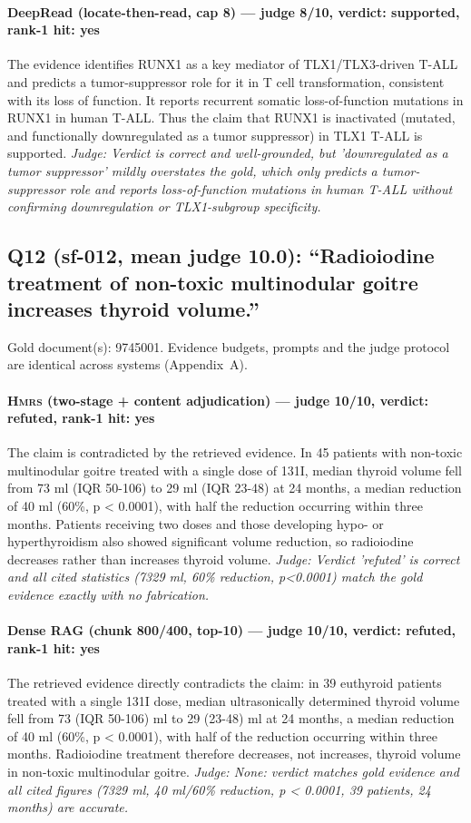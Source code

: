 \documentclass[sigconf, review, anonymous]{acmart}
\begin{document}
\paragraph{DeepRead (locate-then-read, cap 8) --- judge 8/10, verdict: supported, rank-1 hit: yes}
\noindent The evidence identifies RUNX1 as a key mediator of TLX1/TLX3-driven T-ALL and predicts a tumor-suppressor role for it in T cell transformation, consistent with its loss of function. It reports recurrent somatic loss-of-function mutations in RUNX1 in human T-ALL. Thus the claim that RUNX1 is inactivated (mutated, and functionally downregulated as a tumor suppressor) in TLX1 T-ALL is supported.
\noindent\small\textit{Judge: Verdict is correct and well-grounded, but 'downregulated as a tumor suppressor' mildly overstates the gold, which only predicts a tumor-suppressor role and reports loss-of-function mutations in human T-ALL without confirming downregulation or TLX1-subgroup specificity.}

\subsection{Q12 (sf-012, mean judge 10.0): ``Radioiodine treatment of non-toxic multinodular goitre increases thyroid volume.''}
\label{app:q12}
\noindent Gold document(s): 9745001. Evidence budgets, prompts and the judge protocol are identical across systems (Appendix~A).
\paragraph{\textbf{\textsc{Hmrs}} (two-stage + content adjudication) --- judge 10/10, verdict: refuted, rank-1 hit: yes}
\noindent The claim is contradicted by the retrieved evidence. In 45 patients with non-toxic multinodular goitre treated with a single dose of 131I, median thyroid volume fell from 73 ml (IQR 50-106) to 29 ml (IQR 23-48) at 24 months, a median reduction of 40 ml (60\%, p < 0.0001), with half the reduction occurring within three months. Patients receiving two doses and those developing hypo- or hyperthyroidism also showed significant volume reduction, so radioiodine decreases rather than increases thyroid volume.
\noindent\small\textit{Judge: Verdict 'refuted' is correct and all cited statistics (7329 ml, 60\% reduction, p<0.0001) match the gold evidence exactly with no fabrication.}
\paragraph{Dense RAG (chunk 800/400, top-10) --- judge 10/10, verdict: refuted, rank-1 hit: yes}
\noindent The retrieved evidence directly contradicts the claim: in 39 euthyroid patients treated with a single 131I dose, median ultrasonically determined thyroid volume fell from 73 (IQR 50-106) ml to 29 (23-48) ml at 24 months, a median reduction of 40 ml (60\%, p < 0.0001), with half of the reduction occurring within three months. Radioiodine treatment therefore decreases, not increases, thyroid volume in non-toxic multinodular goitre.
\noindent\small\textit{Judge: None: verdict matches gold evidence and all cited figures (7329 ml, 40 ml/60\% reduction, p < 0.0001, 39 patients, 24 months) are accurate.}
\end{document}
